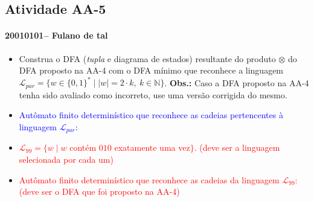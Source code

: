 \documentclass[12pt]{article}
\def\discente{Fulano de tal}
\def\matricula{20010101}
\def\aa{5}
\def\myling{{99}} %
\begin{document}
\pagestyle{empty}
\subsection*{Atividade AA-\aa}
 \paragraph{\matricula -- \discente}
%
 \begin{itemize}
  \item Construa o DFA (\emph{tupla} e diagrama de estados) resultante do produto $\otimes$ do DFA proposto na AA-4 com o DFA mínimo que reconhece a linguagem $\mathcal{L}_{par}=\{w\in\{0,1\}^*\mid |w|=2\cdot k,\ k\in\mathbb{N}\}$. \textbf{Obs.:} Caso a DFA proposto na AA-4 tenha sido avaliado como incorreto, use uma versão corrigida do mesmo.
  \item  \textcolor{blue}{Autômato finito determinístico que reconhece as cadeias pertencentes à linguagem $\mathcal{L}_{par}$:}
   \begin{center}
  \end{center}
  \item \textcolor{red}{$\mathcal{L}_\myling = \{w\mid w$ contém $010$ exatamente uma vez$\}$. (deve ser a linguagem selecionada por cada um)}
  \item  \textcolor{red}{Autômato finito determinístico que reconhece as cadeias da linguagem  $\mathcal{L}_\myling$: (deve ser o DFA que foi proposto na AA-4)}
  \begin{center}
\end{center}
\end{itemize}
\end{document}
